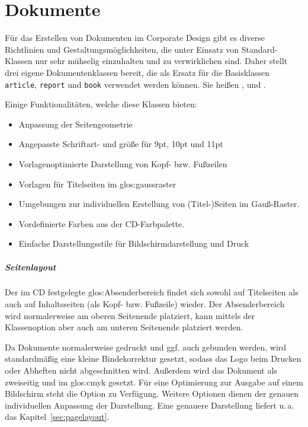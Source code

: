 \chapter{Dokumente}

Für das Erstellen von Dokumenten im Corporate Design gibt es diverse Richtlinien
und Gestaltungsmöglichkeiten, die unter Einsatz von Standard-Klassen nur sehr
mühselig einzuhalten und zu verwirklichen sind.
Daher stellt \tubslatex drei eigene Dokumentenklassen bereit, die als Ersatz für
die Basisklassen \lstinline{article}, \lstinline{report} und \lstinline{book} 
verwendet werden können. Sie heißen ,
 und .

Einige Funktionalitäten, welche diese Klassen bieten:
\begin{itemize}
  \item Anpassung der Seitengeometrie
  \item Angepasste Schriftart- und größe für 9pt, 10pt und 11pt
  \item Vorlagenoptimierte Darstellung von Kopf- bzw. Fußzeilen
  \item Vorlagen für Titelseiten im \gls{glos:gaussraster}
  \item Umgebungen zur individuellen Erstellung von (Titel-)Seiten im Gauß-Raster.
  \item Vordefinierte Farben aus der \acs{CD}-Farbpalette.
  \item Einfache Darstellungsstile für Bildschirmdarstellung und Druck
\end{itemize}

\paragraph{Seitenlayout}

Der im \acs{CD} festgelegte \gls{glos:Absenderbereich} findet sich sowohl auf
Titelseiten als auch auf Inhaltsseiten (als Kopf- bzw. Fußzeile) wieder.
Der Absenderbereich wird normalerweise am oberen Seitenende platziert,
kann mittels der Klassenoption  aber auch am unteren
Seitenende platziert werden.

Da Dokumente normalerweise gedruckt und ggf. auch gebunden werden,
wird standardmäßig eine kleine Bindekorrektur gesetzt, sodass das
Logo beim Drucken oder Abheften nicht abgeschnitten wird.
Außerdem wird das Dokument als zweiseitig und im \gls{glos:cmyk} gesetzt.
Für eine Optimierung zur Ausgabe auf einem Bildschirm steht die Option
 zu Verfügung. Weitere Optionen dienen der
genauen individuellen Anpassung der Darstellung. Eine genauere Darstellung
liefert \mbox{u.\,a.}\xspace das Kapitel~\ref{sec:pagelayout}.

